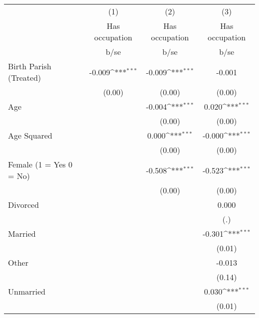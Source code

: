 {
\def\sym#1{\ifmmode^{#1}\else\(^{#1}\)\fi}
\begin{tabular}{l*{3}{c}}
\hline\hline
                    &\multicolumn{1}{c}{(1)}&\multicolumn{1}{c}{(2)}&\multicolumn{1}{c}{(3)}\\
                    &\multicolumn{1}{c}{Has occupation}&\multicolumn{1}{c}{Has occupation}&\multicolumn{1}{c}{Has occupation}\\
                    &        b/se         &        b/se         &        b/se         \\
\hline
Birth Parish (Treated)&      -0.009\sym{***}&      -0.009\sym{***}&      -0.001         \\
                    &      (0.00)         &      (0.00)         &      (0.00)         \\
Age                 &                     &      -0.004\sym{***}&       0.020\sym{***}\\
                    &                     &      (0.00)         &      (0.00)         \\
Age Squared         &                     &       0.000\sym{***}&      -0.000\sym{***}\\
                    &                     &      (0.00)         &      (0.00)         \\
Female (1 = Yes 0 = No)&                     &      -0.508\sym{***}&      -0.523\sym{***}\\
                    &                     &      (0.00)         &      (0.00)         \\
Divorced            &                     &                     &       0.000         \\
                    &                     &                     &         (.)         \\
Married             &                     &                     &      -0.301\sym{***}\\
                    &                     &                     &      (0.01)         \\
Other               &                     &                     &      -0.013         \\
                    &                     &                     &      (0.14)         \\
Unmarried           &                     &                     &       0.030\sym{***}\\
                    &                     &                     &      (0.01)         \\

\end{tabular}}
